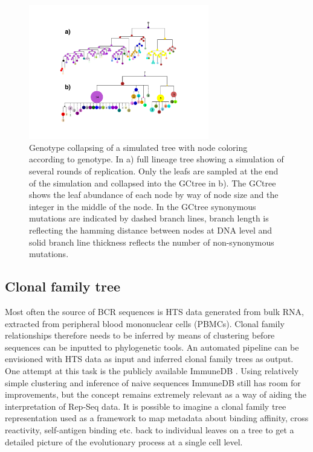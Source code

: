 \begin{figure}[!ht]
    \centering
    \includegraphics[width=0.7\textwidth]{figures/collapsed_tree_example.pdf}
    \caption{
        \label{fig:collapsed_tree_example}
        Genotype collapsing of a simulated tree with node coloring according to genotype.
        In a) full lineage tree showing a simulation of several rounds of replication.
        Only the leafs are sampled at the end of the simulation and collapsed into the GCtree in b).
        The GCtree shows the leaf abundance of each node by way of node size and the integer in the middle of the node.
        In the GCtree synonymous mutations are indicated by dashed branch lines, branch length is reflecting the hamming distance between nodes at DNA level and solid branch line thickness reflects the number of non-synonymous mutations.
    }
\end{figure}





\subsection{Clonal family tree}
Most often the source of BCR sequences is HTS data generated from bulk RNA, extracted from peripheral blood mononuclear cells (PBMCs).
Clonal family relationships therefore needs to be inferred by means of clustering before sequences can be inputted to phylogenetic tools.
An automated pipeline can be envisioned with HTS data as input and inferred clonal family trees as output.
One attempt at this task is the publicly available ImmuneDB \cite{rosenfeld2017immunedb}.
Using relatively simple clustering and inference of naive sequences ImmuneDB still has room for improvements, but the concept remains extremely relevant as a way of aiding the interpretation of Rep-Seq data.
It is possible to imagine a clonal family tree representation used as a framework to map metadata about binding affinity, cross reactivity, self-antigen binding etc. back to individual leaves on a tree to get a detailed picture of the evolutionary process at a single cell level.






